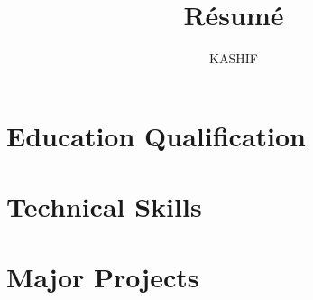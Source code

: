\documentclass[11pt]{article}
\begin{document}
\title{R\'esum\'e}
\author{KASHIF}
\maketitle

\section{Education Qualification}

\section{Technical Skills}

\section{Major Projects}
\end{document}
